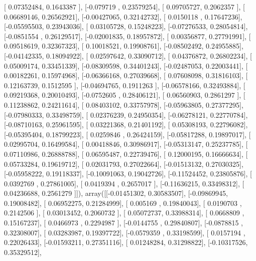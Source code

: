 \documentclass{article}
\begin{document}
       [ 0.07352484,  0.1643387 ],
       [-0.079719  ,  0.23579254],
       [ 0.09705727,  0.2062357 ],
       [ 0.06689146,  0.26562921],
       [-0.00427065,  0.32142732],
       [ 0.0150118 ,  0.17647236],
       [-0.05595503,  0.23943036],
       [ 0.03105728,  0.15248223],
       [-0.07276533,  0.28054814],
       [-0.0851554 ,  0.26129517],
       [-0.02001835,  0.18957872],
       [ 0.00356877,  0.27791991],
       [ 0.09518619,  0.32367323],
       [ 0.10018521,  0.19908761],
       [-0.08502492,  0.24955885],
       [-0.04142335,  0.18094922],
       [ 0.02597642,  0.33090712],
       [ 0.04376872,  0.26802234],
       [ 0.05009174,  0.33451339],
       [-0.08309598,  0.34401243],
       [-0.02487053,  0.22003441],
       [ 0.00182261,  0.15974968],
       [-0.06366168,  0.27039668],
       [ 0.07608098,  0.31816103],
       [ 0.12163739,  0.1512595 ],
       [-0.04694765,  0.1911263 ],
       [-0.06578166,  0.32493884],
       [ 0.09219368,  0.20010493],
       [-0.0752605 ,  0.28406121],
       [ 0.06560903,  0.2861297 ],
       [ 0.11238862,  0.24211614],
       [ 0.08403102,  0.33757978],
       [-0.05963805,  0.27377295],
       [-0.07980333,  0.33498759],
       [ 0.02376239,  0.24950354],
       [-0.06278121,  0.22770784],
       [-0.08710163,  0.25961595],
       [ 0.03221368,  0.21401192],
       [ 0.05308193,  0.22796082],
       [-0.05395404,  0.18799223],
       [ 0.0259846 ,  0.26424159],
       [-0.05817288,  0.19897017],
       [ 0.02995704,  0.16499584],
       [ 0.00418846,  0.30986917],
       [-0.05313147,  0.25237785],
       [ 0.07110986,  0.26888788],
       [ 0.06595487,  0.22739476],
       [ 0.12000195,  0.16666634],
       [ 0.05733284,  0.19619712],
       [ 0.02031793,  0.27022664],
       [-0.01513132,  0.27030325],
       [-0.05958222,  0.19118337],
       [-0.10091063,  0.19042726],
       [-0.11524452,  0.23805876],
       [ 0.0392769 ,  0.27861005],
       [ 0.0419394 ,  0.2657017 ],
       [-0.11636215,  0.33498312],
       [ 0.04236688,  0.2561279 ]]), array([[-0.01451302,  0.30583507],
       [-0.09869945,  0.19008482],
       [ 0.06952275,  0.21284999],
       [ 0.005169  ,  0.19840043],
       [ 0.0190703 ,  0.2142506 ],
       [ 0.03013452,  0.2060732 ],
       [ 0.05072737,  0.33988314],
       [ 0.0668809 ,  0.15167237],
       [ 0.0466973 ,  0.2294987 ],
       [-0.0144755 ,  0.29840807],
       [-0.0878815 ,  0.32308007],
       [ 0.03283987,  0.19397722],
       [-0.0579359 ,  0.33198599],
       [ 0.0157194 ,  0.22026433],
       [-0.01593211,  0.27351116],
       [ 0.01248284,  0.31298822],
       [-0.10317526,  0.35329512],
\end{document}
